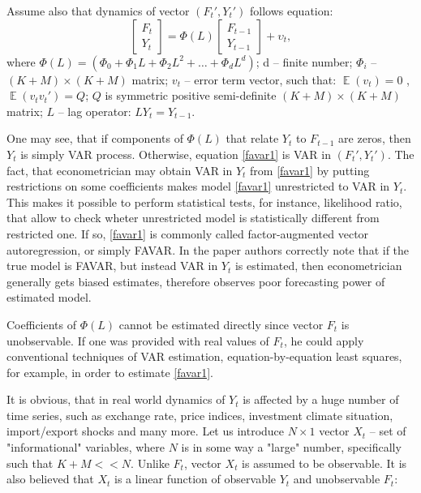 \documentclass[a4paper, 14pt]{article}
\DeclareMathOperator*{\E}{\mathbb{E}}
\begin{document}
Assume also that dynamics of vector $(F_t', Y_t')$ follows equation:
\begin{equation}\label{favar1}
	\begin{bmatrix}
	F_t \\
	Y_t
	\end{bmatrix} = \Phi (L) 
	\begin{bmatrix}
	F_{t-1} \\
	Y_{t-1}
	\end{bmatrix} + \upsilon_t ,
\end{equation}
where $\Phi (L) = (\Phi_0 + \Phi_1 L + \Phi_2 L^2 + \dotso + \Phi_d L^d)$;  d -- finite number; $\Phi_i$ -- $(K+M) \times (K+M)$ matrix; $v_t$ -- error term vector, such that: $\E(v_t) = 0$ , $\E(v_t v_t') = Q$; $Q$ is symmetric positive semi-definite $(K+M) \times (K+M)$ matrix; $L$ -- lag operator: $L Y_t = Y_{t-1}$.

One may see, that if components of $\Phi(L)$ that relate $Y_t$ to $F_{t-1}$ are zeros, then $Y_t$ is simply VAR process. Otherwise, equation \eqref{favar1} is VAR in $(F_t', Y_t')$. The fact, that econometrician may obtain VAR in $Y_t$ from \eqref{favar1} by putting restrictions on some coefficients makes model \eqref{favar1} unrestricted to VAR in $Y_t$. This makes it possible to perform statistical tests, for instance, likelihood ratio, that allow to check wheter unrestricted model is statistically different from restricted one. If so, \eqref{favar1} is commonly called factor-augmented vector autoregression, or simply FAVAR. In the paper \cite{bernanke2005measuring} authors correctly note that if the true model is FAVAR, but instead VAR in $Y_t$ is estimated, then econometrician generally gets biased estimates, therefore observes poor forecasting power of estimated model.

Coefficients of $\Phi(L)$ cannot be estimated directly since vector $F_t$ is unobservable. If one was provided with real values of $F_t$, he could apply conventional techniques of VAR estimation, equation-by-equation least squares, for example, in order to estimate \eqref{favar1}. 

It is obvious, that in real world dynamics of $Y_t$ is affected by a huge number of time series, such as exchange rate, price indices, investment climate situation, import/export shocks and many more. Let us introduce $N\times 1$ vector $X_t$ -- set of "informational" variables, where $N$ is in some way a "large" number, specifically such that $K+M << N$. Unlike $F_t$, vector $X_t$ is assumed to be observable. It is also believed that $X_t$ is a linear function of observable $Y_t$ and unobservable $F_t$:
 
\end{document}
